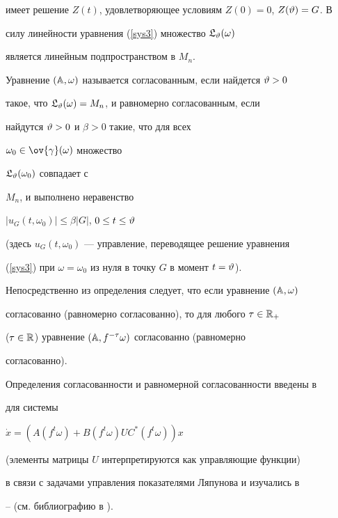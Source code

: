 имеет решение $Z(t)$, удовлетворяющее условиям $Z(0)=0$, $Z(\vartheta)=G$. В


силу линейности уравнения (\ref{sys3}) множество $\frak L_{\vartheta}(\omega)$


является линейным подпространством в $M_n$.





\begin{defn}


\label{d2}


Уравнение $(\Bbb A,\omega)$ называется согласованным, если найдется $\vartheta>0$


такое, что $\frak L_{\vartheta}(\omega)=M_n$, и равномерно согласованным, если


найдутся $\vartheta>0$ и $\beta>0$ такие, что для всех


$\omega_0\in\ov{\gamma}(\omega)$ множество


$\frak L_{\vartheta}(\omega_0)$ совпадает с


$M_n$, и выполнено неравенство


$|u_G(t,\omega_0)|\le\beta|G|$, $0\le t\le\vartheta$


(здесь $u_G(t,\omega_0)$ --- управление, переводящее решение уравнения


(\ref{sys3}) при $\omega=\omega_0$ из нуля в точку $G$ в момент $t=\vartheta$).


\end{defn}





\begin{note}


\label{rem2}


Непосредственно из определения следует, что если уравнение $(\Bbb A,\omega)$


согласованно (равномерно согласованно), то для любого $\tau\in\Bbb R_+$


($\tau\in\Bbb R$) уравнение $(\Bbb A,f^{-\tau}\omega)$ согласованно (равномерно


согласованно).


\end{note}





\begin{note}


\label{rem3}


Определения согласованности и равномерной согласованности введены в


\cite{PT94} для системы


$\Dot x=(A(f^t\omega)+B(f^t\omega)UC^*(f^t\omega))x$


(элементы матрицы $U$ интерпретируются как управляющие функции)


в связи с задачами управления показателями Ляпунова и изучались в


\cite{PT95}--\cite{PT97} (см. библиографию в \cite{PT97}).


\end{note}





